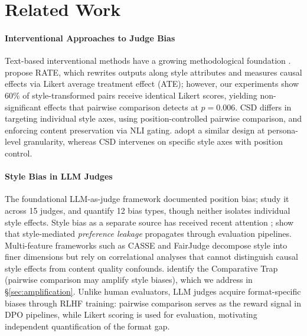 \section{Related Work}
\label{sec:related_work}

\paragraph{Interventional Approaches to Judge Bias}
Text-based interventional methods have a growing methodological foundation \citep{feder2021causalm,wu2021polyjuice,feder2022causal}.
\citet{reber2025rate} propose RATE, which rewrites outputs along style attributes and measures causal effects via Likert average treatment effect (ATE); however, our experiments show 60\% of style-transformed pairs receive identical Likert scores, yielding non-significant effects that pairwise comparison detects at $p = 0.006$.
CSD differs in targeting individual style axes, using position-controlled pairwise comparison, and enforcing content preservation via NLI gating.
\citet{counterfactual2025rhetorical} adopt a similar design at persona-level granularity, whereas CSD intervenes on specific style axes with position control.

\paragraph{Style Bias in LLM Judges}
The foundational LLM-as-judge framework \citep{zheng2023judging} documented position bias; \citet{shi2024judging} study it across 15 judges, and \citet{ye2024justice} quantify 12 bias types, though neither isolates individual style effects.
Style bias as a separate source has received recent attention \citep{wu2023style,feuer2025sos,saito2023verbosity,li2026preference,soumik2026judging}; \citet{li2026preference} show that style-mediated \emph{preference leakage} propagates through evaluation pipelines.
Multi-feature frameworks such as CASSE \citep{casse2026concise} and FairJudge \citep{wang2026fairjudge} decompose style into finer dimensions but rely on correlational analyses that cannot distinguish causal style effects from content quality confounds.
\citet{jeong2025comparative} identify the Comparative Trap (pairwise comparison may amplify style biases), which we address in \S\ref{sec:amplification}.
Unlike human evaluators, LLM judges acquire format-specific biases through RLHF training: pairwise comparison serves as the reward signal in DPO pipelines, while Likert scoring is used for evaluation, motivating independent quantification of the format gap.

